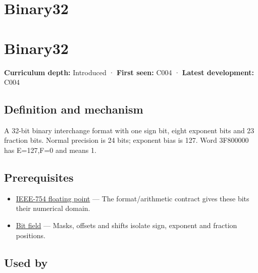 \hypertarget{appendix-5057f9ad327f}{}
\section*{Binary32}
\section{Binary32}\label{binary32}

\textbf{Curriculum depth:} Introduced · \textbf{First seen:} C004 · \textbf{Latest development:} C004

\subsection{Definition and mechanism}\label{definition-and-mechanism}

A 32-bit binary interchange format with one sign bit, eight exponent bits and 23 fraction bits. Normal precision is 24 bits; exponent bias is 127. Word 3F800000 has E=127,F=0 and means 1.

\subsection{Prerequisites}\label{prerequisites}

\begin{itemize}
\tightlist
\item
  \hyperref[appendix-343615f49ddf]{IEEE-754 floating point} --- The format/arithmetic contract gives these bits their numerical domain.
\item
  \hyperref[appendix-ac697f5c66e8]{Bit field} --- Masks, offsets and shifts isolate sign, exponent and fraction positions.
\end{itemize}

\subsection{Used by}\label{used-by}

